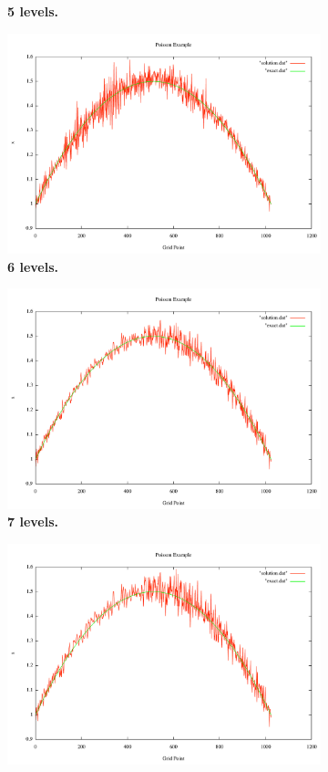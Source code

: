 \documentclass[note]{TechNote}
\begin{document}
\begin{figure}[h!]
\begin{subfigure}[b]{0.32\textwidth}
    \caption{\textbf{5 levels.}}
  \end{subfigure}
  \begin{subfigure}[b]{0.32\textwidth}
    \includegraphics[width=\textwidth]{7_sec_6_level.pdf}
    \caption{\textbf{6 levels.}}
  \end{subfigure}
  \begin{subfigure}[b]{0.32\textwidth}
    \includegraphics[width=\textwidth]{7_sec_7_level.pdf}
    \caption{\textbf{7 levels.}}
  \end{subfigure}
  \begin{subfigure}[b]{0.32\textwidth}
    \includegraphics[width=\textwidth]{7_sec_8_level.pdf}

\end{subfigure}
\end{figure}
\end{document}
